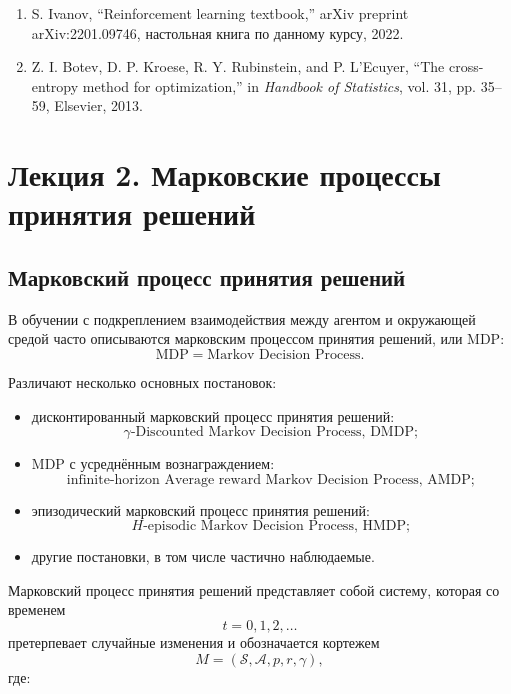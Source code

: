 \documentclass[12pt,a4paper]{article}
\begin{document}
\begin{enumerate}
    \item S. Ivanov, ``Reinforcement learning textbook,'' arXiv preprint arXiv:2201.09746, настольная книга по данному курсу, 2022.

    \item Z. I. Botev, D. P. Kroese, R. Y. Rubinstein, and P. L'Ecuyer, ``The cross-entropy method for optimization,'' in \textit{Handbook of Statistics}, vol. 31, pp. 35--59, Elsevier, 2013.
\end{enumerate}

\section{Лекция 2. Марковские процессы принятия решений}

\subsection{Марковский процесс принятия решений}

В обучении с подкреплением взаимодействия между агентом и окружающей средой часто описываются марковским процессом принятия решений, или MDP:
\[
\text{MDP} = \text{Markov Decision Process}.
\]

Различают несколько основных постановок:
\begin{itemize}
    \item дисконтированный марковский процесс принятия решений:
    \[
    \gamma\text{-Discounted Markov Decision Process, DMDP};
    \]
    \item MDP с усреднённым вознаграждением:
    \[
    \text{infinite-horizon Average reward Markov Decision Process, AMDP};
    \]
    \item эпизодический марковский процесс принятия решений:
    \[
    H\text{-episodic Markov Decision Process, HMDP};
    \]
    \item другие постановки, в том числе частично наблюдаемые.
\end{itemize}

Марковский процесс принятия решений представляет собой систему, которая со временем
\[
t = 0, 1, 2, \ldots
\]
претерпевает случайные изменения и обозначается кортежем
\[
M = (\mathcal S, \mathcal A, p, r, \gamma),
\]
где:
\end{document}
